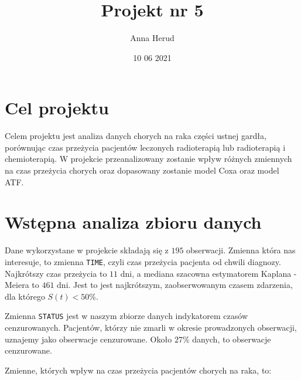 \documentclass[
]{article}
\title{Projekt nr 5}
\author{Anna Herud}
\date{10 06 2021}
\begin{document}
\maketitle

\hypertarget{cel-projektu}{%
\section{Cel projektu}\label{cel-projektu}}

Celem projektu jest analiza danych chorych na raka części ustnej gardła,
porównując czas przeżycia pacjentów leczonych radioterapią lub
radioterapią i chemioterapią. W projekcie przeanalizowany zostanie wpływ
różnych zmiennych na czas przeżycia chorych oraz dopasowany zostanie
model Coxa oraz model ATF.

\hypertarget{wstux119pna-analiza-zbioru-danych}{%
\section{Wstępna analiza zbioru
danych}\label{wstux119pna-analiza-zbioru-danych}}

Dane wykorzystane w projekcie składają się z \(195\) obserwacji. Zmienna
która nas interesuje, to zmienna \texttt{TIME}, czyli czas przeżycia
pacjenta od chwili diagnozy. Najkrótszy czas przeżycia to \(11\) dni, a
mediana szacowna estymatorem Kaplana - Meiera to \(461\) dni. Jest to
jest najkrótszym, zaobserwowanym czasem zdarzenia, dla którego
\(S(t) < 50 \%.\)

Zmienna \texttt{STATUS} jest w naszym zbiorze danych indykatorem czasów
cenzurowanych. Pacjentów, którzy nie zmarli w okresie prowadzonych
obserwacji, uznajemy jako obserwacje cenzurowane. Około \(27\%\) danych,
to obserwacje cenzurowane.

Zmienne, których wpływ na czas przeżycia pacjentów chorych na raka, to:
\end{document}
